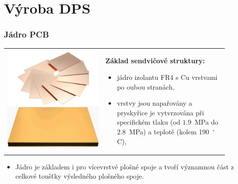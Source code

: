 \documentclass{beamer}
\begin{document}
\section{\texorpdfstring{Výroba DPS}{Výroba DPS}}
\begin{frame}
	\frametitle{Jádro PCB}
	
	\begin{center}
			\begin{tabular}{m{0.4\linewidth} m{0.5\linewidth}}
			\includegraphics[scale=0.12]{jadro.png} & \textbf{Základ sendvičové struktury:}
			\begin{itemize}
				\item jádro izolantu FR4 s Cu vrstvami po oubou stranách,
				\item vrstvy jsou napařovány a pryskyřice je vytvrzována při specifickém tlaku (od $1.9$~MPa do $2.8$~MPa) a teplotě (kolem 190~$^\circ$C),
			\end{itemize}
			\end{tabular}
		\end{center}
		
		\begin{itemize}
			\item Jádro je základem i pro vícevrstvé plošné spoje a tvoří významnou část z celkové toušťky výsledného plošného spoje.
		\end{itemize}
	
\end{frame}
\end{document}
